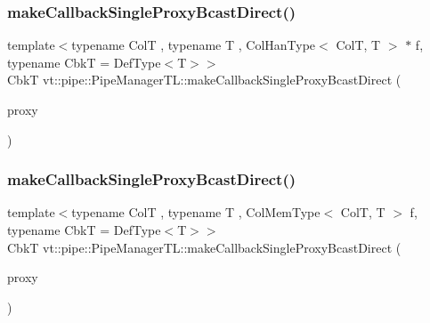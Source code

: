 \mbox{\label{structvt_1_1pipe_1_1_pipe_manager_t_l_aff70024da9ee15ef2c935ca21d18a80d}} 
\subsubsection{\texorpdfstring{make\+Callback\+Single\+Proxy\+Bcast\+Direct()}{makeCallbackSingleProxyBcastDirect()}\hspace{0.1cm}{\footnotesize\ttfamily [1/3]}}
{\footnotesize\ttfamily template$<$typename ColT , typename T , Col\+Han\+Type$<$ Col\+T, T $>$ $\ast$ f, typename CbkT  = Def\+Type$<$\+T$>$$>$ \\
CbkT vt\+::pipe\+::\+Pipe\+Manager\+T\+L\+::make\+Callback\+Single\+Proxy\+Bcast\+Direct (\begin{DoxyParamCaption}\item[{\hyperlink{structvt_1_1pipe_1_1_pipe_manager_t_l_af56c58cad882496e35f01227d4da3898}{Col\+Proxy\+Type}$<$ ColT $>$}]{proxy }\end{DoxyParamCaption})}

\mbox{\label{structvt_1_1pipe_1_1_pipe_manager_t_l_aff70024da9ee15ef2c935ca21d18a80d}} 
\subsubsection{\texorpdfstring{make\+Callback\+Single\+Proxy\+Bcast\+Direct()}{makeCallbackSingleProxyBcastDirect()}\hspace{0.1cm}{\footnotesize\ttfamily [2/3]}}
{\footnotesize\ttfamily template$<$typename ColT , typename T , Col\+Mem\+Type$<$ Col\+T, T $>$ f, typename CbkT  = Def\+Type$<$\+T$>$$>$ \\
CbkT vt\+::pipe\+::\+Pipe\+Manager\+T\+L\+::make\+Callback\+Single\+Proxy\+Bcast\+Direct (\begin{DoxyParamCaption}\item[{\hyperlink{structvt_1_1pipe_1_1_pipe_manager_t_l_af56c58cad882496e35f01227d4da3898}{Col\+Proxy\+Type}$<$ ColT $>$}]{proxy }\end{DoxyParamCaption})}


